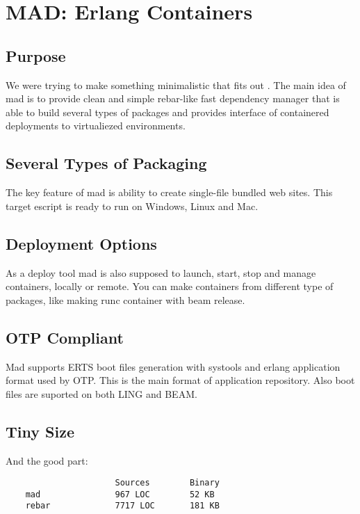\section{MAD: Erlang Containers}

\subsection{Purpose}
We were trying to make something minimalistic that fits out .
The main idea of mad is to provide clean and simple rebar-like fast dependency manager that
is able to build several types of packages and provides interface of containered deployments
to virtualiezed environments.

\subsection{Several Types of Packaging}
The key feature of mad is ability to create single-file bundled web sites.
This target escript is ready to run on Windows, Linux and Mac.

\subsection{Deployment Options}
As a deploy tool mad is also supposed to launch, start, stop and manage containers, locally or remote.
You can make containers from different type of packages, like making runc container with beam release.

\subsection{OTP Compliant}
Mad supports ERTS boot files generation with systools and erlang application format used by OTP.
This is the main format of application repository. Also boot files are suported on both LING and BEAM.

\subsection{Tiny Size}
And the good part:

\vspace{1\baselineskip}
\begin{lstlisting}
                      Sources        Binary
    mad               967 LOC        52 KB
    rebar             7717 LOC       181 KB
\end{lstlisting}
\vspace{1\baselineskip}

